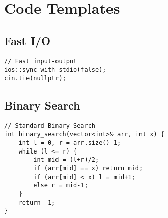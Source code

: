 \section{Code Templates}

\subsection{Fast I/O}
\begin{lstlisting}
// Fast input-output
ios::sync_with_stdio(false);
cin.tie(nullptr);
\end{lstlisting}

\subsection{Binary Search}
\begin{lstlisting}
// Standard Binary Search
int binary_search(vector<int>& arr, int x) {
    int l = 0, r = arr.size()-1;
    while (l <= r) {
        int mid = (l+r)/2;
        if (arr[mid] == x) return mid;
        if (arr[mid] < x) l = mid+1;
        else r = mid-1;
    }
    return -1;
}
\end{lstlisting}
